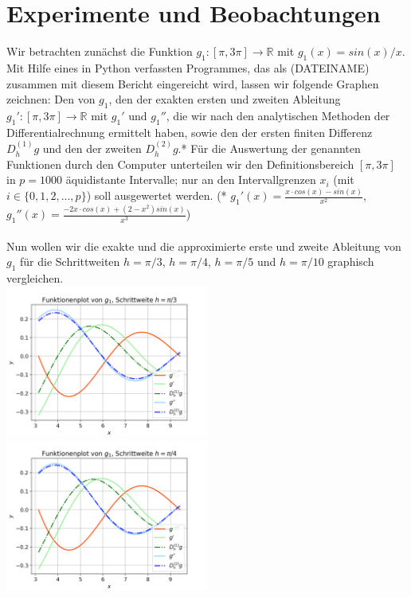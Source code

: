 \documentclass{scrartcl}
\begin{document}
\pagebreak \section{Experimente und Beobachtungen}
\label{sec:experimente}

Wir betrachten zunächst die Funktion $g_1:[\pi, 3\pi] \rightarrow \mathbb{R}$ mit $g_1(x) = sin(x)/x$. Mit Hilfe eines in Python verfassten Programmes, das als (DATEINAME) zusammen mit diesem Bericht eingereicht wird, lassen wir folgende Graphen zeichnen:
Den von $g_1$, den der exakten ersten und zweiten Ableitung $g_1': [\pi, 3\pi] \rightarrow \mathbb{R}$ mit $g_1'$ und $g_1''$, die wir nach den analytischen Methoden der Differentialrechnung ermittelt haben, sowie den der ersten finiten Differenz $D_h^{(1)}g$ und den der zweiten $D_h^{(2)}g$.*
Für die Auswertung der genannten Funktionen durch den Computer unterteilen wir den Definitionsbereich $[\pi, 3\pi]$ in $p = 1000$ äquidistante Intervalle; nur an den Intervallgrenzen $x_i$ (mit $i \in \lbrace 0, 1, 2, ..., p \rbrace$) soll ausgewertet werden. 
(* $g_1'(x) = \frac{x \cdot cos(x) - sin(x)}{x^{2}}$, $g_1''(x) = \frac{-2x \cdot cos(x) + (2-x^{2}) sin(x)}{x^{3}}$) \\
\\
Nun wollen wir die exakte und die approximierte erste und zweite Ableitung von $g_1$ für die Schrittweiten $h = \pi/3$, $h = \pi/4$, $h = \pi/5$ und $h = \pi/10$ graphisch vergleichen. \\
\includegraphics[width=0.5\textwidth]{Grafiken/Funktionenplot_Pi_Drittel} \includegraphics[width=0.5\textwidth]{Grafiken/Funktionenplot_Pi_Viertel}\\
\end{document}
